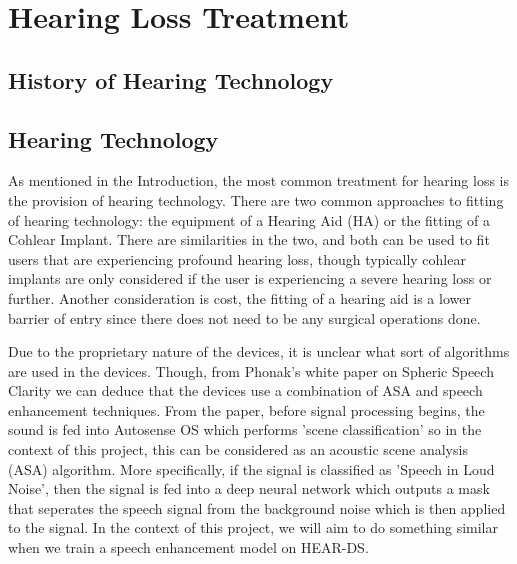 \documentclass[logo,bsc,singlespacing,parskip,online]{infthesis}
\begin{document}
\section{Hearing Loss Treatment}

\subsection{History of Hearing Technology}




\subsection{Hearing Technology}
As mentioned in the Introduction, the most common treatment for hearing loss 
is the provision of hearing technology. There are two common approaches 
to fitting of hearing technology: the equipment of a Hearing Aid (HA) 
or the fitting of a Cohlear Implant. There are similarities in the 
two, and both can be used to fit users that are experiencing profound hearing loss, 
though typically cohlear implants are only considered if the user is experiencing 
a severe hearing loss or further. Another consideration is cost,
the fitting of a hearing aid is a lower barrier of entry since there 
does not need to be any surgical operations done. 

Due to the proprietary nature of the devices, it is unclear what sort of 
algorithms are used in the devices. Though, from Phonak's white paper on Spheric Speech Clarity \cite{Hasemann2024PhonakSphere}
we can deduce that the devices use a combination of ASA and speech enhancement techniques.
From the paper, before signal processing begins, the sound is fed into Autosense OS which 
performs 'scene classification' so in the context of this project, this can be 
considered as an acoustic scene analysis (ASA) algorithm. More specifically, if 
the signal is classified as 'Speech in Loud Noise', then the signal is fed into a 
deep neural network which outputs a mask that seperates the speech signal from the background noise 
which is then applied to the signal. In the context of this project, we will aim to do something similar 
when we train a speech enhancement model on HEAR-DS. 



\end{document}
